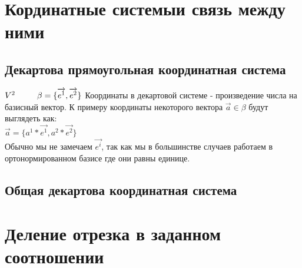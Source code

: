 \documentclass{book}
\begin{document}
\chapter{Кординатные системы и связь между ними}
\section{Декартова прямоугольная координатная система}
$V^2\ \ \ \ \ \ \ \ \beta=\{\overrightarrow{e^1},\overrightarrow{e^2}\}\\$
Координаты в декартовой системе - произведение числа на базисный вектор. К примеру координаты некоторого вектора $\overrightarrow{a} \in \beta$ будут выглядеть как:\\
$\overrightarrow{a}=\{a^1*\overrightarrow{e^1},a^2*\overrightarrow{e^2}\}$\\
Обычно мы не замечаем $\overrightarrow{e^i}$, так как мы в большинстве случаев работаем в ортонормированном базисе где они равны единице.
\begin{figure}[h!]
\end{figure}
\section{Общая декартова координатная система}
\chapter{Деление отрезка в заданном соотношении}
\end{document}

